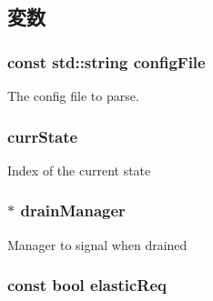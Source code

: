 \subsection{変数}
\hypertarget{classTrafficGen_ad5835f1d2646493dafb2c5ac6244a93f}{
\subsubsection[{configFile}]{\setlength{\rightskip}{0pt plus 5cm}const std::string {\bf configFile}}}
\label{classTrafficGen_ad5835f1d2646493dafb2c5ac6244a93f}
The config file to parse. \hypertarget{classTrafficGen_a8428fe009627d1dd49ef98a54587830e}{
\subsubsection[{currState}]{ {\bf currState}}}
\label{classTrafficGen_a8428fe009627d1dd49ef98a54587830e}
Index of the current state \hypertarget{classTrafficGen_a329b71fb934a93312ca0aacbf5a3f982}{
\subsubsection[{drainManager}]{$\ast$ {\bf drainManager}}}
\label{classTrafficGen_a329b71fb934a93312ca0aacbf5a3f982}
Manager to signal when drained \hypertarget{classTrafficGen_a42af28607a09ff1b95b5e848bf73f915}{
\subsubsection[{elasticReq}]{\setlength{\rightskip}{0pt plus 5cm}const bool {\bf elasticReq}}}
\label{classTrafficGen_a42af28607a09ff1b95b5e848bf73f915}
